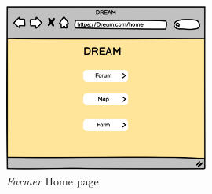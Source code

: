 \begin{figure}[H]
    \begin{center}
        \includegraphics[width=0.6\textwidth]{mockups/FHome.png}
        \caption{\emph{Farmer} Home page}
        \label{fig:homepage}
    \end{center}
\end{figure}

